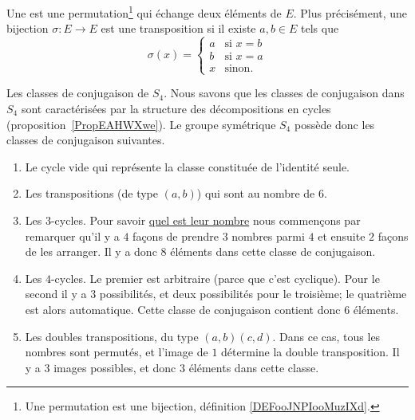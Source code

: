 \begin{definition}[transposition]      \label{DEFooXNAFooGTbTTJ}
	Une  est une permutation\footnote{Une permutation est une bijection, définition \ref{DEFooJNPIooMuzIXd}.} qui échange deux éléments de \( E\). Plus précisément, une bijection \( \sigma\colon E\to E\) est une transposition si il existe \( a,b\in E\) tels que
	\begin{equation}
		\sigma(x)=\begin{cases}
			a & \text{si } x=b \\
			b & \text{si } x=a \\
			x & \text{sinon. }
		\end{cases}
	\end{equation}
\end{definition}

\begin{example} \label{ExVYZPzub}
	Les classes de conjugaison de \( S_4\). Nous savons que les classes de conjugaison dans \( S_4\) sont caractérisées par la structure des décompositions en cycles (proposition~\ref{PropEAHWXwe}). Le groupe symétrique \( S_4\) possède donc les classes de conjugaison suivantes.
	\begin{enumerate}
		\item
		      Le cycle vide qui représente la classe constituée de l'identité seule.
		\item
		      Les transpositions (de type \( (a,b)\)) qui sont au nombre de \( 6\).
		\item
		      Les \( 3\)-cycles. Pour savoir \href{http://www.toujourspret.com/techniques/expression/chants/C/cantique_des_etoiles.php}{quel est leur nombre} nous commençons par remarquer qu'il y a \( 4\) façons de prendre \( 3\) nombres parmi \( 4\) et ensuite \( 2\) façons de les arranger. Il y a donc \( 8\) éléments dans cette classe de conjugaison.
		\item
		      Les \( 4\)-cycles. Le premier est arbitraire (parce que c'est cyclique). Pour le second il y a \( 3\) possibilités, et deux possibilités pour le troisième; le quatrième est alors automatique. Cette classe de conjugaison contient donc \( 6\) éléments.
		\item       \label{ITEMooGCMYooKZgFHX}
		      Les doubles transpositions, du type \( (a,b)(c,d)\). Dans ce cas, tous les nombres sont permutés, et l'image de \( 1\) détermine la double transposition. Il y a \( 3\) images possibles, et donc \( 3\) éléments dans cette classe.
	\end{enumerate}
\end{example}

